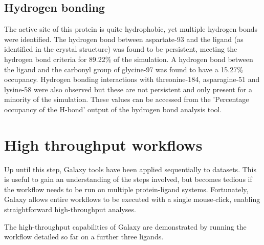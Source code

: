 \documentclass[twocolumn]{bmcart}%
\begin{document}
\subsection*{Hydrogen bonding}
The active site of this protein is quite hydrophobic, yet multiple hydrogen bonds were identified. The hydrogen bond between aspartate-93 and the ligand (as identified in the crystal structure) was found to be persistent, meeting the hydrogen bond criteria for 89.22\% of the simulation. A hydrogen bond between the ligand and the carbonyl group of glycine-97 was found to have a 15.27\% occupancy. Hydrogen bonding interactions with threonine-184, asparagine-51 and lysine-58 were also observed but these are not persistent and only present for a minority of the simulation. These values can be accessed from the 'Percentage occupancy of the H-bond' output of the hydrogen bond analysis tool. 

\hypertarget{optional-automating-high-throughput-calculations}{%
\section*{High throughput workflows}\label{optional-automating-high-throughput-calculations}}

Up until this step, Galaxy tools have been applied sequentially to datasets. This is useful to gain an understanding of the steps involved, but becomes tedious if the workflow needs to be run on multiple protein-ligand systems. Fortunately, Galaxy allows entire workflows to be executed with a single mouse-click, enabling straightforward high-throughput analyses.

The high-throughput capabilities of Galaxy are demonstrated by running the workflow detailed so far on a further three ligands.
\end{document}
